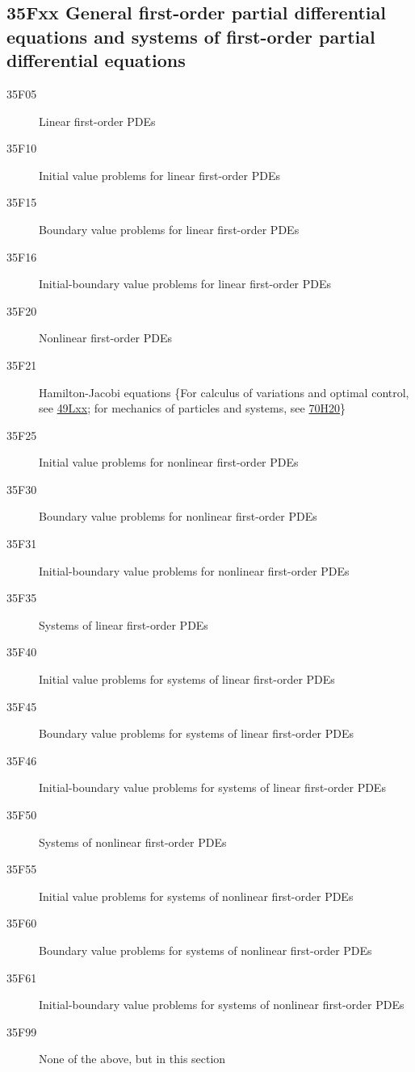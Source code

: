 \documentclass[letterpaper]{article}
\begin{document}
\subsection*{35Fxx  General first-order partial differential equations and systems of first-order partial differential equations}\label{35Fxx}
\begin{description}  
\item [35F05]\label{35F05} Linear first-order PDEs
\item [35F10]\label{35F10} Initial value problems for linear first-order PDEs
\item [35F15]\label{35F15} Boundary value problems for linear first-order PDEs
\item [35F16]\label{35F16} Initial-boundary value problems for linear first-order PDEs
\item [35F20]\label{35F20} Nonlinear first-order PDEs
\item [35F21]\label{35F21} Hamilton-Jacobi equations \{For calculus of variations and optimal control, see \hyperref[49Lxx]{49Lxx}; for mechanics of particles and systems, see \hyperref[70H20]{70H20}\}
\item [35F25]\label{35F25} Initial value problems for nonlinear first-order PDEs
\item [35F30]\label{35F30} Boundary value problems for nonlinear first-order PDEs
\item [35F31]\label{35F31} Initial-boundary value problems for nonlinear first-order PDEs
\item [35F35]\label{35F35} Systems  of linear first-order PDEs
\item [35F40]\label{35F40} Initial value problems for  systems  of linear first-order PDEs
\item [35F45]\label{35F45} Boundary value problems for systems of linear first-order PDEs
\item [35F46]\label{35F46} Initial-boundary value problems for systems of linear first-order PDEs
\item [35F50]\label{35F50} Systems  of nonlinear first-order PDEs
\item [35F55]\label{35F55} Initial value problems for systems of nonlinear first-order PDEs
\item [35F60]\label{35F60} Boundary value problems for systems of nonlinear first-order PDEs
\item [35F61]\label{35F61} Initial-boundary value problems for systems of nonlinear first-order PDEs 
\item [35F99]\label{35F99} None of the above, but in this section
\end{description}
\end{document}
